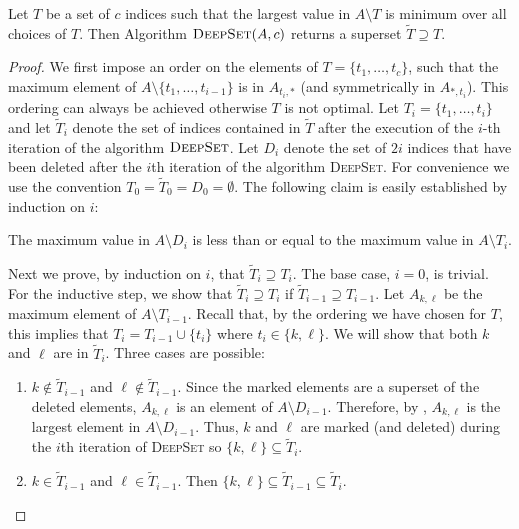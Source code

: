 \documentclass[lotsofwhite]{patmorin}
\begin{document}
\begin{lem}
Let $T$ be a set of $c$ indices such that the largest value in
$A\setminus T$ is minimum over all choices of $T$.  Then
Algorithm $\textsc{DeepSet}(A,c)$ returns a superset
$\tilde{T}\supseteq T$.
\end{lem}

\begin{proof}
We first impose an order on the elements of $T=\{t_1,\ldots,t_c\}$,
such that the maximum element of $A \setminus \{t_1,\ldots,t_{i-1}\}$
is in $A_{t_{i},*}$ (and symmetrically in
$A_{*,t_{i}}$).  This ordering can always be achieved otherwise $T$ is
not optimal.  Let $T_i = \{t_1,\ldots,t_i\}$ and let $\tilde{T}_i$
denote the set of indices contained in $\tilde{T}$ after the execution
of the $i$-th iteration of the algorithm $\textsc{DeepSet}$.  Let
$D_i$ denote the set of $2i$ indices that have been deleted after the
$i$th iteration of the algorithm \textsc{DeepSet}.  For convenience we
use the convention $T_0=\tilde{T}_0=D_0=\emptyset$.  The following
claim is easily established by induction on $i$:

\begin{clm}
The maximum value in $A\setminus D_i$ is less than or equal to the
maximum value in $A\setminus T_i$.
\end{clm}

Next we prove, by induction on $i$, that $\tilde{T}_{i}\supseteq T_i$.
The base case, $i=0$, is trivial.  For the inductive step, we show
that $\tilde{T}_i \supseteq T_i$ if $\tilde{T}_{i-1} \supseteq
T_{i-1}$.  Let $A_{k,\ell}$ be the maximum element of $A \setminus
T_{i-1}$.  Recall that, by the ordering we have chosen for $T$, this
implies that $T_i=T_{i-1}\cup\{t_i\}$ where $t_i\in\{k,\ell\}$.  We
will show that both $k$ and $\ell$ are in $\tilde{T}_i$. Three cases
are possible: 

\begin{enumerate}

\item $k \not \in \tilde{T}_{i-1}$ and $\ell \not \in
\tilde{T}_{i-1}$.  Since the marked elements are a superset of the
deleted elements, $A_{k,\ell}$ is an element of $A \setminus D_{i-1}$.
Therefore, by , $A_{k,\ell}$ is the largest
element in $A\setminus D_{i-1}$.  Thus, $k$ and $\ell$ are marked (and
deleted) during the $i$th iteration of \textsc{DeepSet} so
$\{k,\ell\}\subseteq\tilde{T}_i$. 

\item $k \in \tilde{T}_{i-1}$ and $\ell \in \tilde{T}_{i-1}$.  Then
$\{k,\ell\}\subseteq \tilde{T}_{i-1}\subseteq \tilde{T}_i$.


\end{enumerate}
\end{proof}
\end{document}
